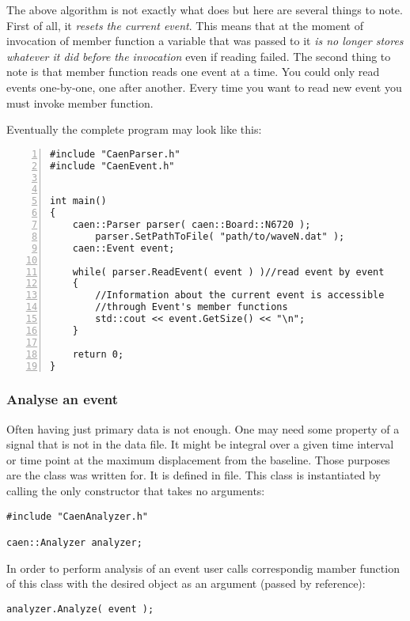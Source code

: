The above algorithm is not exactly what  does but here are several things 
to note. First of all, it \emph{resets the current event}. This means that at the moment
of invocation of  member function a variable that was passed to it
\emph{is no longer stores whatever it did before the invocation} even if reading failed. The second thing to
note is that  member function reads one event at a time. You could only
read events one-by-one, one after another. Every time you want to read new event you must
invoke  member function.


Eventually the complete program may look like this: 
\begin{lstlisting}[numbers=left, caption={Print size of each event stored in \codet{waveN.dat} file}]
#include "CaenParser.h"
#include "CaenEvent.h"


int main()
{
    caen::Parser parser( caen::Board::N6720 );
        parser.SetPathToFile( "path/to/waveN.dat" );
    caen::Event event;

    while( parser.ReadEvent( event ) )//read event by event
    {
        //Information about the current event is accessible
        //through Event's member functions 
        std::cout << event.GetSize() << "\n";
    }

    return 0;
}
\end{lstlisting}

\subsubsection{Analyse an event}\label{sssec:anal}
Often having just primary data is not enough. One may need some property of a signal that
is not in the data file. It might be integral over a given time interval or time point at the maximum
displacement from the baseline. Those purposes are the  class was written
for. It is defined in  file. This class is instantiated by calling the only
constructor that takes no arguments:

\begin{lstlisting}
#include "CaenAnalyzer.h"

caen::Analyzer analyzer;
\end{lstlisting}

In order to perform analysis of an event user calls correspondig mamber function of this
class with the desired  object as an argument (passed by reference):
\begin{lstlisting}
analyzer.Analyze( event );
\end{lstlisting}
